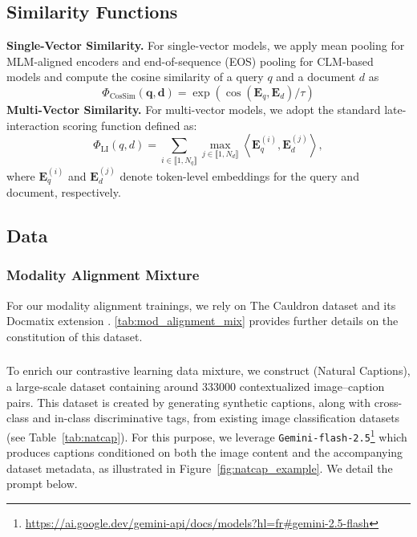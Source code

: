 \subsection{Similarity Functions}
\label{appendix:similarity_functions}
\noindent\textbf{Single-Vector Similarity.}
For single-vector models, we apply mean pooling for MLM-aligned encoders and end-of-sequence (EOS) pooling for CLM-based models and compute the cosine similarity of a query $q$ and a document $d$ as
\begin{equation}
\label{eq:cosine_sim}
    \Phi_\mathrm{CosSim}(\mathbf{q},\mathbf{d}) = \exp(\cos(\mathbf{E}_q,\mathbf{E}_d)/\tau)
\end{equation}
\noindent\textbf{Multi-Vector Similarity.}
For multi-vector models, we adopt the standard late-interaction scoring function defined as:
\begin{equation}
\label{eq:li_sim}
\Phi_\mathrm{LI}(q,d) = \sum_{i \in \llbracket 1, N_q \rrbracket}
\max_{j \in \llbracket 1, N_d \rrbracket}
\left\langle \mathbf{E}_q^{(i)} , \mathbf{E}_d^{(j)} \right\rangle ,
\end{equation}
where $\mathbf{E}_q^{(i)}$ and $\mathbf{E}_d^{(j)}$ denote token-level embeddings for the query and document, respectively.

\subsection{Data}

\subsubsection{Modality Alignment Mixture}
\label{appendix:alignment_mixture}

For our modality alignment trainings, we rely on The Cauldron dataset \citep{laurencon_what_2024} and its Docmatix extension \citep{laurençon2024building}. \autoref{tab:mod_alignment_mix} provides further details on the constitution of this dataset.


\subsubsection{\natcap{}}
\label{appendix:natcap}
To enrich our contrastive learning data mixture, we construct \natcap{} (Natural Captions), a large-scale dataset containing around 333000 contextualized image–caption pairs. This dataset is created by generating synthetic captions, along with cross-class and in-class discriminative tags, from existing image classification datasets (see Table~\ref{tab:natcap}). For this purpose, we leverage \texttt{Gemini-flash-2.5}\footnote{\url{https://ai.google.dev/gemini-api/docs/models?hl=fr\#gemini-2.5-flash}} which produces captions conditioned on both the image content and the accompanying dataset metadata, as illustrated in Figure~\ref{fig:natcap_example}. We detail the prompt below.

